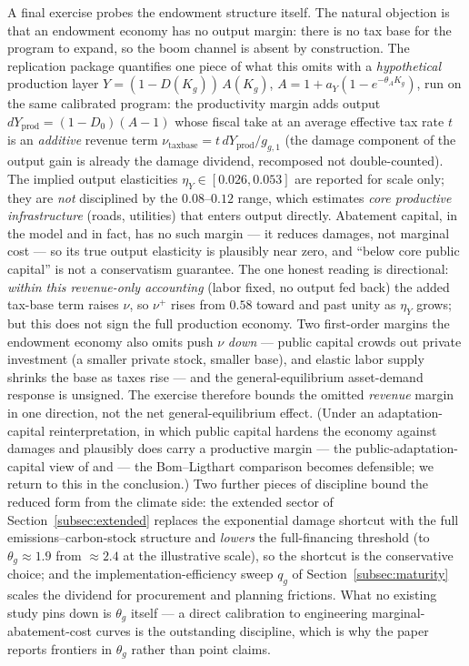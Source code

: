 \documentclass[12pt]{article}
\begin{document}
A final exercise probes the endowment structure itself. The natural
objection is that an endowment economy has no output margin: there is no tax
base for the program to expand, so the \citet{angeletos2024deficits} boom
channel is absent by construction. The replication package quantifies one
piece of what this omits with a \emph{hypothetical} production layer
$Y = (1-D(K_g))\,A(K_g)$, $A = 1 + a_Y(1 - e^{-\theta_A K_g})$, run on the
same calibrated program: the productivity margin adds output
$dY_{\mathrm{prod}} = (1-D_0)(A-1)$ whose fiscal take at an average
effective tax rate $t$ is an \emph{additive} revenue term
$\nu_{\mathrm{taxbase}} = t\, dY_{\mathrm{prod}}/g_{g,1}$ (the damage
component of the output gain is already the damage dividend, recomposed not
double-counted). The implied output elasticities $\eta_Y\in[0.026,0.053]$
are reported for scale only; they are \emph{not} disciplined by the
\citet{bomligthart2014} $0.08$--$0.12$ range, which estimates \emph{core
productive infrastructure} (roads, utilities) that enters output directly.
Abatement capital, in the model and in fact, has no such margin --- it
reduces damages, not marginal cost --- so its true output elasticity is
plausibly near zero, and ``below core public capital'' is not a conservatism
guarantee. The one honest reading is directional: \emph{within this
revenue-only accounting} (labor fixed, no output fed back) the added
tax-base term raises $\nu$, so $\nu^{+}$ rises from $0.58$ toward and past
unity as $\eta_Y$ grows; but this does not sign the full production economy.
Two first-order margins the endowment economy also omits push $\nu$
\emph{down} --- public capital crowds out private investment (a smaller
private stock, smaller base), and elastic labor supply shrinks the base as
taxes rise --- and the general-equilibrium asset-demand response is unsigned.
The exercise therefore bounds the omitted \emph{revenue} margin in one
direction, not the net general-equilibrium effect. (Under an
adaptation-capital reinterpretation, in which public capital hardens the
economy against damages and plausibly does carry a productive margin ---
the public-adaptation-capital view of \citet{fried2022seawalls} and
\citet{konradtweder2023} --- the
Bom--Ligthart comparison becomes defensible; we return to this in the
conclusion.) Two further pieces of discipline bound the reduced form from
the climate side:
the extended sector of Section~\ref{subsec:extended} replaces the
exponential damage shortcut with the full emissions--carbon-stock
structure and \emph{lowers} the full-financing threshold (to
$\theta_g \approx 1.9$ from $\approx 2.4$ at the illustrative scale), so
the shortcut is the conservative choice; and the implementation-efficiency
sweep $q_g$ of Section~\ref{subsec:maturity} scales the dividend for
procurement and planning frictions. What no existing study pins down is
$\theta_g$ itself --- a direct calibration to engineering
marginal-abatement-cost curves is the outstanding discipline, which is why
the paper reports frontiers in $\theta_g$ rather than point claims.
\end{document}
